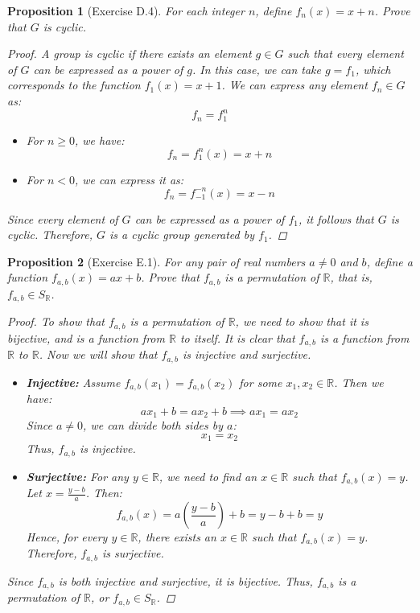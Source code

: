 \documentclass[12pt]{article}
\newcommand{\R}{\mathbb{R}} %
\newtheorem{proposition}{Proposition}
\begin{document}
\begin{proposition}[Exercise D.4]
  For each integer $n$, define $f_n(x) = x + n$.
  Prove that $G$ is cyclic.
  \begin{proof}
    A group is cyclic if there exists an element $g \in G$ such that every element of $G$ can be expressed as a power of $g$.
    In this case, we can take $g = f_1$, which corresponds to the function $f_1(x) = x + 1$.
    We can express any element $f_n \in G$ as:
    \[
      f_n = f_1^n
    \]
    \begin{itemize}
      \item For $n \geq 0$, we have:
            \[
              f_n = f_1^n(x) = x + n
            \]
      \item For $n < 0$, we can express it as:
            \[
              f_n = f_{-1}^{-n}(x) = x - n
            \]
    \end{itemize}
    Since every element of $G$ can be expressed as a power of $f_1$, it follows that $G$ is cyclic.
    Therefore, $G$ is a cyclic group generated by $f_1$.
  \end{proof}
\end{proposition}


\begin{proposition}[Exercise E.1]
  For any pair of real numbers $a \neq 0$ and $b$, define a function $f_{a,b}(x) = ax + b$.
  Prove that $f_{a,b}$ is a permutation of $\R$, that is, $f_{a,b} \in S_{\R}$.
  \begin{proof}
    To show that $f_{a,b}$ is a permutation of $\R$, we need to show that it is bijective,
    and is a function from $\R$ to itself.
    It is clear that $f_{a,b}$ is a function from $\R$ to $\R$.
    Now we will show that $f_{a,b}$ is injective and surjective.
    \begin{itemize}
      \item \textbf{Injective:} Assume $f_{a,b}(x_1) = f_{a,b}(x_2)$ for some $x_1, x_2 \in \R$.
            Then we have:
            \[
              ax_1 + b = ax_2 + b \implies ax_1 = ax_2
            \]
            Since $a \neq 0$, we can divide both sides by $a$:
            \[
              x_1 = x_2
            \]
            Thus, $f_{a,b}$ is injective.

      \item \textbf{Surjective:} For any $y \in \R$, we need to find an $x \in \R$ such that $f_{a,b}(x) = y$.
            Let $x = \frac{y - b}{a}$. Then:
            \[
              f_{a,b}(x) = a\left(\frac{y - b}{a}\right) + b = y - b + b = y
            \]
            Hence, for every $y \in \R$, there exists an $x \in \R$ such that $f_{a,b}(x) = y$.
            Therefore, $f_{a,b}$ is surjective.
    \end{itemize}
    Since $f_{a,b}$ is both injective and surjective, it is bijective.
    Thus, $f_{a,b}$ is a permutation of $\R$, or $f_{a,b} \in S_{\R}$.
  \end{proof}
\end{proposition}
\end{document}
